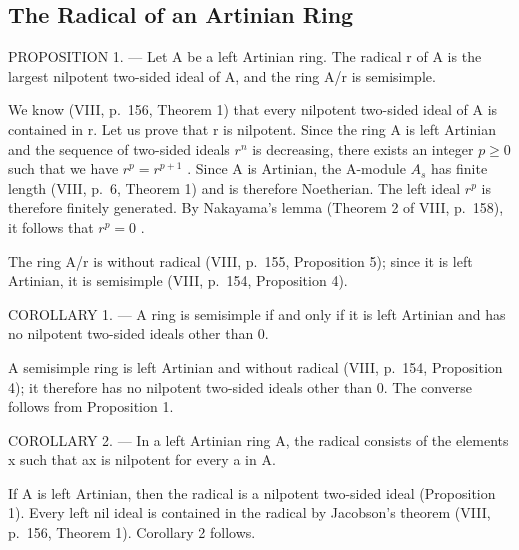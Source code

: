\subsection{The Radical of an Artinian Ring}

PROPOSITION 1. --- Let A be a left Artinian ring. The radical r of A is the largest nilpotent two-sided ideal of A, and the ring A/r is semisimple.

We know (VIII, p.~156, Theorem 1) that every nilpotent two-sided ideal of A is contained in r. Let us prove that r is nilpotent. Since the ring A is left Artinian and the sequence of two-sided ideals \(r^{n}\) is decreasing, there exists an integer \(p \geqslant 0\) such that we have \(r^{p} = r^{p+1}\) . Since A is Artinian, the A-module \(A_{s}\) has finite length (VIII, p.~6, Theorem 1) and is therefore Noetherian. The left ideal \(r^{p}\) is therefore finitely generated. By Nakayama's lemma (Theorem 2 of VIII, p.~158), it follows that \(r^{p} = 0\) .

The ring A/r is without radical (VIII, p.~155, Proposition 5); since it is left Artinian, it is semisimple (VIII, p.~154, Proposition 4).

COROLLARY 1. --- A ring is semisimple if and only if it is left Artinian and has no nilpotent two-sided ideals other than 0.

A semisimple ring is left Artinian and without radical (VIII, p.~154, Proposition 4); it therefore has no nilpotent two-sided ideals other than 0. The converse follows from Proposition 1.

COROLLARY 2. --- In a left Artinian ring A, the radical consists of the elements x such that ax is nilpotent for every a in A.

If A is left Artinian, then the radical is a nilpotent two-sided ideal (Proposition 1). Every left nil ideal is contained in the radical by Jacobson's theorem (VIII, p.~156, Theorem 1). Corollary 2 follows.

